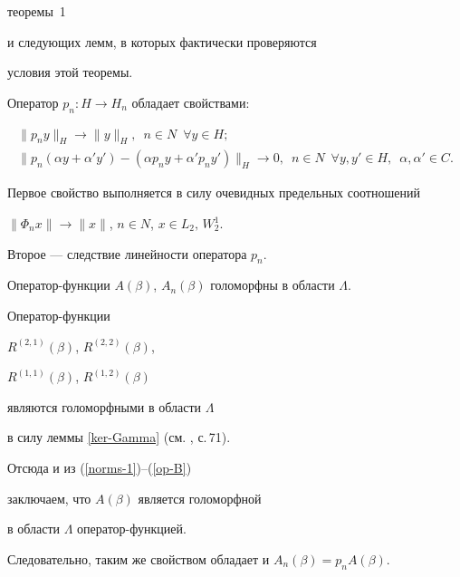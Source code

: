 теоремы~1 \cite{209611220014}


и следующих лемм, в которых фактически проверяются 


условия этой теоремы.





\begin{lem}


\label{Cond1}


Оператор $p_n: H\to H_n $ обладает свойствами$:$


\begin{gather*}


\|p_ny\|_{H}\to \|y\|_H,\ \; n \in N \ \; \forall y \in H;\\


\|p_n(\alpha y+\alpha' y')-(\alpha p_n y+\alpha'p_n y')\|_{H}\to 0,


\ \; n \in N \ \; \forall y,y' \in H,\ \; \alpha,\alpha'\in C.


\end{gather*}


\end{lem}





Первое свойство выполняется в силу очевидных предельных соотношений


$\|\Phi_n x\| \to \|x\|$, $n \in N$, $x \in L_2,\, W_2^1$.


Второе --- следствие линейности оператора $p_n$.





\begin{lem}


\label{Cond2}


Оператор-функции $A(\beta)$, $A_n(\beta)$ голоморфны в области $\Lambda$.


\end{lem}





\begin{pf} Оператор-функции


$R^{(2,1)}(\beta)$, $R^{(2,2)}(\beta)$,


$R^{(1,1)}(\beta)$, $R^{(1,2)}(\beta)$


являются голоморфными в области $\Lambda$ 


в силу леммы \ref{ker-Gamma} (см. \cite{199603040004}, с.\,71).


Отсюда и из (\ref{norms-1})--(\ref{op-B}) 


заключаем, что $A(\beta)$ является голоморфной 


в области $\Lambda$ оператор-функцией.


Следовательно, таким же свойством обладает и $A_n(\beta) = p_nA(\beta)$. 


\end{pf}





